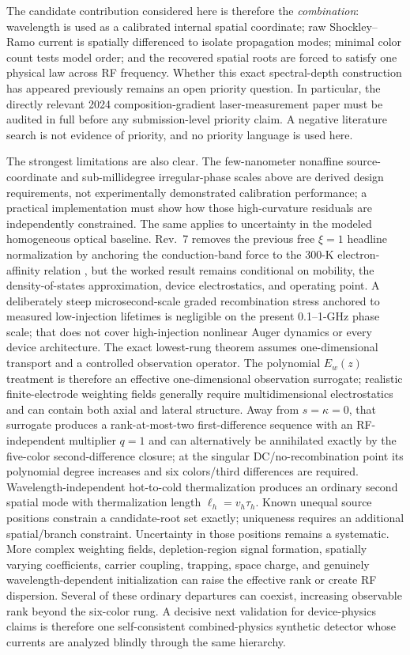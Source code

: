 \documentclass[11pt]{article}
\begin{document}
The candidate contribution considered here is therefore the \emph{combination}: wavelength is used as a calibrated internal spatial coordinate; raw Shockley--Ramo current is spatially differenced to isolate propagation modes; minimal color count tests model order; and the recovered spatial roots are forced to satisfy one physical law across RF frequency. Whether this exact spectral-depth construction has appeared previously remains an open priority question. In particular, the directly relevant 2024 composition-gradient laser-measurement paper \cite{Xu2024Laser} must be audited in full before any submission-level priority claim. A negative literature search is not evidence of priority, and no priority language is used here.

The strongest limitations are also clear. The few-nanometer nonaffine source-coordinate and sub-millidegree irregular-phase scales above are derived design requirements, not experimentally demonstrated calibration performance; a practical implementation must show how those high-curvature residuals are independently constrained. The same applies to uncertainty in the modeled homogeneous optical baseline. Rev.~7 removes the previous free $\xi=1$ headline normalization by anchoring the conduction-band force to the 300-K electron-affinity relation \cite{RhigerMustafa2025}, but the worked result remains conditional on mobility, the density-of-states approximation, device electrostatics, and operating point. A deliberately steep microsecond-scale graded recombination stress anchored to measured low-injection lifetimes \cite{Kopytko2021} is negligible on the present 0.1--1-GHz phase scale; that does not cover high-injection nonlinear Auger dynamics or every device architecture. The exact lowest-rung theorem assumes one-dimensional transport and a controlled observation operator. The polynomial $E_w(z)$ treatment is therefore an effective one-dimensional observation surrogate; realistic finite-electrode weighting fields generally require multidimensional electrostatics and can contain both axial and lateral structure. Away from $s=\kappa=0$, that surrogate produces a rank-at-most-two first-difference sequence with an RF-independent multiplier $q=1$ and can alternatively be annihilated exactly by the five-color second-difference closure; at the singular DC/no-recombination point its polynomial degree increases and six colors/third differences are required. Wavelength-independent hot-to-cold thermalization produces an ordinary second spatial mode with thermalization length $\ell_h=v_h\tau_h$. Known unequal source positions constrain a candidate-root set exactly; uniqueness requires an additional spatial/branch constraint. Uncertainty in those positions remains a systematic. More complex weighting fields, depletion-region signal formation, spatially varying coefficients, carrier coupling, trapping, space charge, and genuinely wavelength-dependent initialization can raise the effective rank or create RF dispersion. Several of these ordinary departures can coexist, increasing observable rank beyond the six-color rung. A decisive next validation for device-physics claims is therefore one self-consistent combined-physics synthetic detector whose currents are analyzed blindly through the same hierarchy. 
\end{document}
